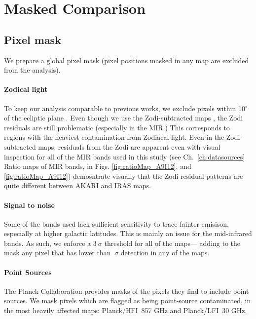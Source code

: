       \section{Masked Comparison}


      \subsection{Pixel mask}
          We prepare a global pixel mask (pixel positions masked in any map are excluded from the analysis).

        \paragraph{Zodical light}
          To keep our analysis comparable to previous works, we exclude pixels within 10$^{\circ}$ of the ecliptic plane \citep{hensley16}.  Even though we use the Zodi-subtracted maps \citep{kelsall98, kondo16, ootsubo16}, the Zodi residuals are still problematic (especially in the MIR.) This corresponds to regions with the heaviest contamination from Zodiacal light. Even in the Zodi-subtracted maps, residuals from the Zodi are apparent even with visual inspection for all of the MIR bands used in this study (see Ch.~\ref{ch:datasources} Ratio maps of MIR bands, in Figs. \ref{fig:ratioMap_A9I12}, and \ref{fig:ratioMap_A9I12}) demosntrate visually that the Zodi-residual patterns are quite different between AKARI and IRAS maps.

        \paragraph{Signal to noise}
          Some of the bands used lack sufficient sensitivity to trace fainter emisison, especially at higher galactic latitudes. This is mainly an issue for the mid-infrared bands. As such, we enforce a $3~\sigma$ threshold for all of the maps--- adding to the mask any pixel that has lower than $~\sigma$ detection in any of the maps.

       \paragraph{Point Sources}
         The Planck Collaboration provides masks of the pixels they find to include point sources. We mask pixels which are flagged as being point-source contaminated, in the most heavily affected maps: Planck/HFI~857 GHz and Planck/LFI~30 GHz.

